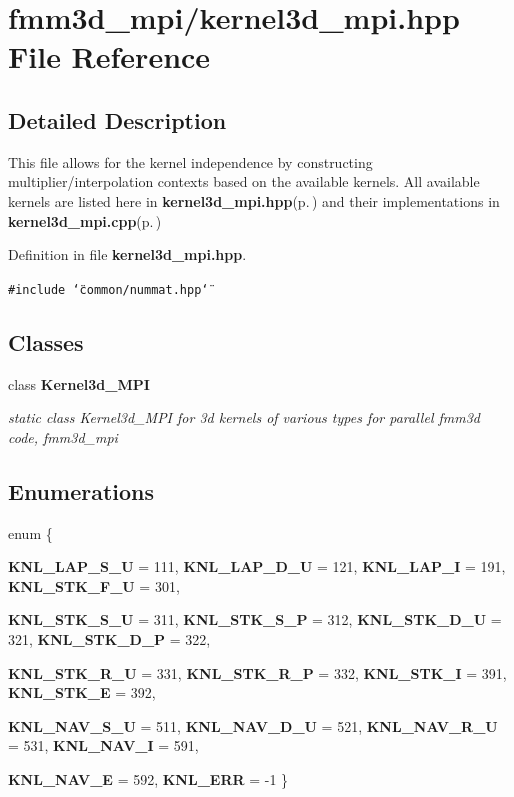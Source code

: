 \section{fmm3d\_\-mpi/kernel3d\_\-mpi.hpp File Reference}
\label{kernel3d__mpi_8hpp}


\subsection{Detailed Description}
This file allows for the kernel independence by constructing multiplier/interpolation contexts based on the available kernels. All available kernels are listed here in {\bf kernel3d\_\-mpi.hpp}{\rm (p.\,\pageref{kernel3d__mpi_8hpp})} and their implementations in {\bf kernel3d\_\-mpi.cpp}{\rm (p.\,\pageref{kernel3d__mpi_8cpp})} 

Definition in file {\bf kernel3d\_\-mpi.hpp}.

{\tt \#include \char`\"{}common/nummat.hpp\char`\"{}}\par
\subsection*{Classes}
\begin{CompactItemize}
\item 
class {\bf Kernel3d\_\-MPI}
\begin{CompactList}\small\item\em static class Kernel3d\_\-MPI for 3d kernels of various types for parallel fmm3d code, fmm3d\_\-mpi \item\end{CompactList}\end{CompactItemize}
\subsection*{Enumerations}
\begin{CompactItemize}
\item 
enum \{ \par
{\bf KNL\_\-LAP\_\-S\_\-U} =  111, 
{\bf KNL\_\-LAP\_\-D\_\-U} =  121, 
{\bf KNL\_\-LAP\_\-I} =  191, 
{\bf KNL\_\-STK\_\-F\_\-U} =  301, 
\par
{\bf KNL\_\-STK\_\-S\_\-U} =  311, 
{\bf KNL\_\-STK\_\-S\_\-P} =  312, 
{\bf KNL\_\-STK\_\-D\_\-U} =  321, 
{\bf KNL\_\-STK\_\-D\_\-P} =  322, 
\par
{\bf KNL\_\-STK\_\-R\_\-U} =  331, 
{\bf KNL\_\-STK\_\-R\_\-P} =  332, 
{\bf KNL\_\-STK\_\-I} =  391, 
{\bf KNL\_\-STK\_\-E} =  392, 
\par
{\bf KNL\_\-NAV\_\-S\_\-U} =  511, 
{\bf KNL\_\-NAV\_\-D\_\-U} =  521, 
{\bf KNL\_\-NAV\_\-R\_\-U} =  531, 
{\bf KNL\_\-NAV\_\-I} =  591, 
\par
{\bf KNL\_\-NAV\_\-E} =  592, 
{\bf KNL\_\-ERR} =  -1
 \}
\end{CompactItemize}
